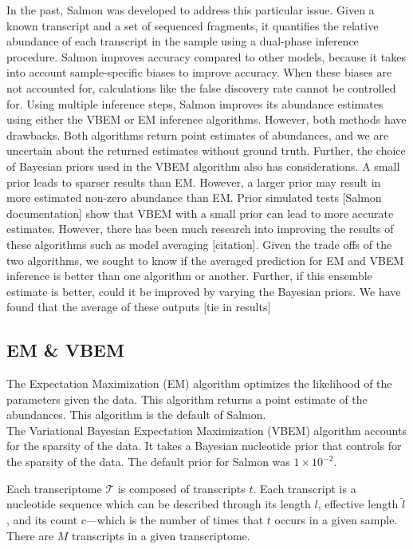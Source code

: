 In the past, Salmon was developed to address this particular issue. 
Given a known transcript and a set of sequenced fragments, it quantifies the relative abundance of each transcript in the sample using a dual-phase inference procedure. Salmon improves accuracy compared to other models, because it takes into account sample-specific biases to improve accuracy. When these biases are not accounted for, calculations like the false discovery rate cannot be controlled for. Using multiple inference steps, Salmon improves its abundance estimates using either the VBEM or EM inference algorithms. However, both methods have drawbacks. Both algorithms return point estimates of abundances, and we are uncertain about the returned estimates without ground truth. Further, the choice of  Bayesian priors used in the VBEM algorithm also has considerations. A small prior leads to sparser results than EM. However, a larger prior may result in more estimated non-zero abundance than EM. Prior simulated tests [Salmon documentation] show that VBEM with a small prior can lead to more accurate estimates. However, there has been much research into improving the results of these algorithms such as model averaging [citation]. Given the trade offs of the two algorithms, we sought to know if the averaged prediction for EM and VBEM inference is better than one algorithm or another. Further, if this ensemble estimate is better, could it be improved by varying the Bayesian priors.
We have found that the average of these outputs [tie in results]


\subsection{EM \& VBEM}

The Expectation Maximization (EM) algorithm optimizes the likelihood of the parameters given the data. This algorithm returns a point estimate of the abundances. 
This algorithm is  the default of Salmon.
\\
The Variational Bayesian Expectation Maximization (VBEM) algorithm accounts for the sparsity of the data. It takes a Bayesian nucleotide prior that controls for the sparsity of the data. The default prior for Salmon was $1 \times 10 ^{-2}$.

Each transcriptome \(\mathcal{T}\) is composed of transcripts \(t\).
Each transcript is a nucleotide sequence which can be described through
its length \(l\), effective length \(\tilde l\), and its count
\(c\)---which is the number of times that \(t\) occurs in a given
sample. There are \(M\) transcripts in a given transcriptome.

